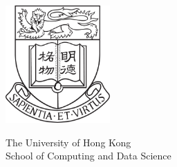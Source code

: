 \begin{titlepage}
\addtocounter{page}{-1}
\begin{center}

\begin{center}
    \includegraphics[width=0.3\textwidth]{figs/2d.jpg} %
\end{center}

\vspace{40pt} %

\begin{center}
    {The University of Hong Kong}\\[10pt] %
    {School of Computing and Data Science}\\[10pt] %
\end{center}

 

\end{center}
\end{titlepage}
